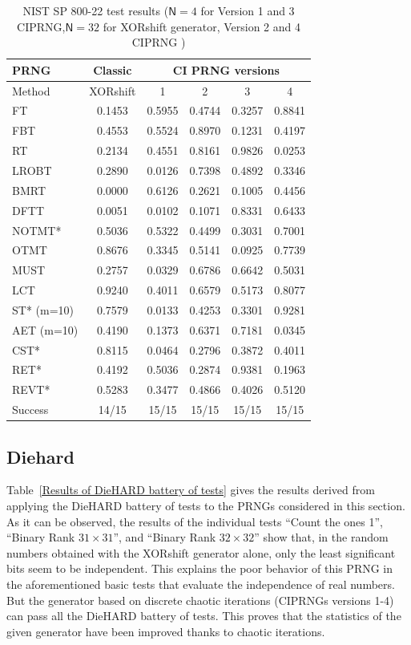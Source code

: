 \begin{table}
\renewcommand{\arraystretch}{1.3}
\caption{NIST SP 800-22 test results ($\mathsf{N}=4$ for Version 1 and 3 CIPRNG,$\mathsf{N}=32$ for XORshift generator, Version 2 and 4 CIPRNG )}
\label{The passing}
\centering
\begin{tabular}{|l||c|c|c|c|c|}
\hline
PRNG & Classic & \multicolumn{4}{c|}{CI PRNG versions}\\ \hline\hline
Method &XORshift& 1 & 2 & 3 &  4\\ \hline

FT			&0.1453&0.5955&0.4744&0.3257 & 0.8841 \\ \hline
FBT			&0.4553&0.5524&0.8970 & 0.1231 &0.4197\\ \hline
RT					&0.2134&0.4551&0.8161&0.9826&0.0253 \\ \hline
LROBT 		&0.2890&0.0126&0.7398&0.4892&0.3346 \\ \hline
BMRT 			&0.0000&0.6126&0.2621&0.1005&0.4456\\ \hline
DFTT	&0.0051&0.0102&0.1071 &0.8331 &0.6433\\ \hline
NOTMT* 	&0.5036&0.5322&0.4499 & 0.3031 & 0.7001 \\ \hline
OTMT 		&0.8676&0.3345&0.5141& 0.0925 &0.7739\\ \hline
MUST			&0.2757&0.0329&0.6786&0.6642&0.5031\\ \hline
LCT		&0.9240&0.4011&0.6579&0.5173&0.8077\\ \hline
ST* (m=10) 				&0.7579&0.0133&0.4253&0.3301&0.9281\\ \hline
AET (m=10) 		&0.4190&0.1373&0.6371&0.7181&0.0345\\ \hline
CST* 			&0.8115&0.0464&0.2796&0.3872&0.4011\\ \hline
RET* 			&0.4192&0.5036&0.2874 &0.9381 &0.1963\\ \hline
REVT* 		&0.5283&0.3477&0.4866& 0.4026 &0.5120\\ \hline
Success 					& 14/15	& 15/15& 15/15&15/15 &15/15 \\ \hline

\end{tabular}
\end{table}

\subsection{Diehard}
\label{Subsec:DieHARD}

Table~\ref{Results of DieHARD battery of tests} gives the results derived from applying the DieHARD battery of tests to the PRNGs considered in this section. As it can be observed, the results of the individual tests ``Count the ones 1'', ``Binary Rank $31 \times 31$'', and ``Binary Rank $32 \times 32$'' show that, in the random numbers obtained with the XORshift generator alone, only the least significant bits seem to be independent. This explains the poor behavior of this PRNG in the aforementioned basic tests that evaluate the independence of real numbers. But the generator based on discrete chaotic iterations (CIPRNGs versions 1-4) can pass all the DieHARD battery of tests. 
This proves that the
statistics of the given generator have been improved thanks to chaotic iterations.

